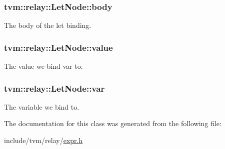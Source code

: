 \subsubsection[{\texorpdfstring{body}{body}}]{ tvm\+::relay\+::\+Let\+Node\+::body}\hypertarget{classtvm_1_1relay_1_1LetNode_ab9446c69397941ecc0d8d348d9da240c}{}\label{classtvm_1_1relay_1_1LetNode_ab9446c69397941ecc0d8d348d9da240c}


The body of the let binding. 

\subsubsection[{\texorpdfstring{value}{value}}]{ tvm\+::relay\+::\+Let\+Node\+::value}\hypertarget{classtvm_1_1relay_1_1LetNode_aeb6d0020580face17b79cbaf0467203c}{}\label{classtvm_1_1relay_1_1LetNode_aeb6d0020580face17b79cbaf0467203c}


The value we bind var to. 

\subsubsection[{\texorpdfstring{var}{var}}]{ tvm\+::relay\+::\+Let\+Node\+::var}\hypertarget{classtvm_1_1relay_1_1LetNode_a3a841faeeb71a7e59f99feffb182a7c1}{}\label{classtvm_1_1relay_1_1LetNode_a3a841faeeb71a7e59f99feffb182a7c1}


The variable we bind to. 



The documentation for this class was generated from the following file\+:\begin{DoxyCompactItemize}
\item 
include/tvm/relay/\hyperlink{relay_2expr_8h}{expr.\+h}\end{DoxyCompactItemize}
